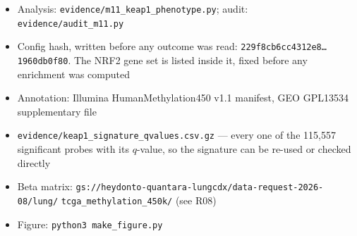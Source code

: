 \documentclass[11pt,a4paper]{article}
\begin{document}
\begin{itemize}[leftmargin=1.2em,itemsep=1pt]
\item Analysis: \texttt{evidence/m11\_keap1\_phenotype.py}; audit:
      \texttt{evidence/audit\_m11.py}
\item Config hash, written before any outcome was read:
      \texttt{229f8cb6cc4312e8\ldots1960db0f80}. The NRF2 gene set is listed inside it, fixed
      before any enrichment was computed
\item Annotation: Illumina HumanMethylation450 v1.1 manifest, GEO GPL13534 supplementary file
\item \texttt{evidence/keap1\_signature\_qvalues.csv.gz} --- every one of the 115{,}557
      significant probes with its $q$-value, so the signature can be re-used or checked directly
\item Beta matrix: \texttt{gs://heydonto-quantara-lungcdx/data-request-2026-08/lung/}
      \texttt{tcga\_methylation\_450k/} (see R08)
\item Figure: \texttt{python3 make\_figure.py}
\end{itemize}
\end{document}
